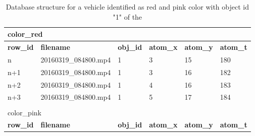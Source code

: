 \begin{table}[hbt]
	\centering 
\caption{Database structure for a vehicle identified as red and pink color with object id "1" of the \versionOne }
\label{table:dbSample}
\begin{tabular}{llllll}
\multicolumn{6}{l}{{ color\_red}} \\ \hline
\multicolumn{1}{|l|}{\textbf{row\_id}} & \multicolumn{1}{l|}{\textbf{filename}}    & \multicolumn{1}{l|}{\textbf{obj\_id}} & \multicolumn{1}{l|}{\textbf{atom\_x}} & \multicolumn{1}{l|}{\textbf{atom\_y}} & \multicolumn{1}{l|}{\textbf{atom\_t}} \\ \hline
\multicolumn{1}{|l|}{n}                & \multicolumn{1}{l|}{20160319\_084800.mp4} & \multicolumn{1}{l|}{1}                & \multicolumn{1}{l|}{3}                & \multicolumn{1}{l|}{15}               & \multicolumn{1}{l|}{180}              \\ \hline
\multicolumn{1}{|l|}{n+1}              & \multicolumn{1}{l|}{20160319\_084800.mp4} & \multicolumn{1}{l|}{1}                & \multicolumn{1}{l|}{3}                & \multicolumn{1}{l|}{16}               & \multicolumn{1}{l|}{182}              \\ \hline
\multicolumn{1}{|l|}{n+2}              & \multicolumn{1}{l|}{20160319\_084800.mp4} & \multicolumn{1}{l|}{1}                & \multicolumn{1}{l|}{4}                & \multicolumn{1}{l|}{16}               & \multicolumn{1}{l|}{183}              \\ \hline
\multicolumn{1}{|l|}{n+3}              & \multicolumn{1}{l|}{20160319\_084800.mp4} & \multicolumn{1}{l|}{1}                & \multicolumn{1}{l|}{5}                & \multicolumn{1}{l|}{17}               & \multicolumn{1}{l|}{184}              \\ \hline
                                       &                                           &                                       &                                       &                                       &                                       \\
\multicolumn{6}{l}{{ color\_pink}}                                                                                                                                                                                                              \\ \hline
\multicolumn{1}{|l|}{\textbf{row\_id}} & \multicolumn{1}{l|}{\textbf{filename}}    & \multicolumn{1}{l|}{\textbf{obj\_id}} & \multicolumn{1}{l|}{\textbf{atom\_x}} & \multicolumn{1}{l|}{\textbf{atom\_y}} & \multicolumn{1}{l|}{\textbf{atom\_t}} \\ \hline

\end{tabular}
\end{table}
